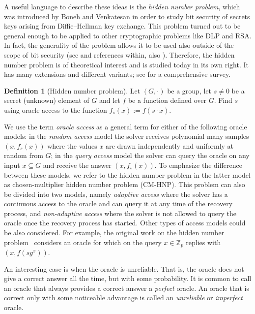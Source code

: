 \documentclass[11pt]{article}
\theoremstyle{definition}
\newtheorem{definition}[theorem]{Definition}
\newcommand{\Z}{\mathbb{Z}}
\begin{document}
A useful language to describe these ideas is the \emph{hidden number problem}, which was introduced by Boneh and Venkatesan \cite{BV} in order to study bit security of secrets keys arising from Diffie--Hellman key exchange. This problem turned out to be general enough to be applied to other cryptographic problems like DLP and RSA. In fact, the generality of the problem allows it to be used also outside of the scope of bit security (see \cite[Section 4.4]{2faces} and references within, also \cite{De-Mulder, GLV/GLS}). Therefore, the hidden number problem is of theoretical interest and is studied today in its own right. It has many extensions and different variants; see \cite{Shparlinski} for a comprehensive survey.

\begin{definition} [Hidden number problem]
    \label{HNP_def}
    Let $(G,\cdot)$ be a group, let $s \neq 0$ be a secret (unknown) element of $G$ and let $f$ be a function defined over $G$. Find $s$ using oracle access to the function $f_s (x) := f(s \cdot x)$.
\end{definition}

We use the term \emph{oracle access} as a general term for either of the following oracle models: in the \emph{random access} model the solver receives polynomial many samples $(x, f_s(x))$ where the values $x$ are drawn independently and uniformly at random from $G$; in the \emph{query access} model the solver can query the oracle on any input $x \subseteq G$ and receive the answer $(x, f_s(x))$. To emphasize the difference between these models, we refer to the hidden number problem in the latter model as chosen-multiplier hidden number problem (CM-HNP). This problem can also be divided into two models, namely \emph{adaptive access} where the solver has a continuous access to the oracle and can query it at any time of the recovery process, and \emph{non-adaptive access} where the solver is not allowed to query the oracle once the recovery process has started. Other types of access models could be also considered. For example, the original work on the hidden number problem~\cite{BV} considers an oracle for which on the query $x \in \Z_p$ replies with $(x, f(s g^x))$.

An interesting case is when the oracle is unreliable. That is, the oracle does not give a correct answer all the time, but with some probability. It is common to call an oracle that always provides a correct answer a \emph{perfect} oracle. An oracle that is correct only with some noticeable advantage is called an \emph{unreliable} or \emph{imperfect} oracle.
\end{document}
